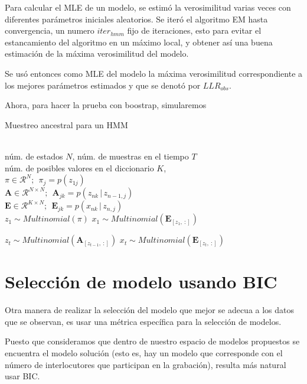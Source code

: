Para calcular el \ac{MLE} de un modelo, se estimó la verosimilitud varias veces con diferentes parámetros iniciales aleatorios. Se iteró el algoritmo \ac{EM} hasta convergencia, un numero $iter_{hmm}$ fijo de iteraciones, esto para evitar el estancamiento del algoritmo en un máximo local, y obtener así una buena estimación de la máxima verosimilitud del modelo.

Se usó entonces como \ac{MLE} del modelo la máxima verosimilitud correspondiente a los mejores parámetros estimados y que se denotó por $LLR_{obs}$.

Ahora, para hacer la prueba con boostrap, simularemos 

\begin{algorithm}[tp]
   \caption{Muestreo ancestral para un HMM}
   \label{alg:ancsamp}
\begin{algorithmic}
    \\
   núm. de estados $N$, núm. de muestras en el tiempo $T$ \\
   núm. de posibles valores en el diccionario $K$, \\
   $ \pi \in \mathcal{R}^{N}; ~~ \pi_j = p(z_{1j})$ \\
   $ \mathbf{A} \in \mathcal{R}^{N \times N}; ~~
   \mathbf{A}_{jk} = p(z_{nk} \,|\, z_{n-1, j})$ \\

   $ \mathbf{E} \in \mathcal{R}^{K \times N}; ~~
   \mathbf{E}_{jk} = p(x_{nk} \,|\, z_{n, j})$\\  
   \STATE
   \STATE $z_1 \sim Multinomial(\pi)$   
   \STATE $x_1 \sim Multinomial(\mathbf{E}_{[z_1,~:]})$

    \STATE $z_t \sim Multinomial(\mathbf{A}_{[z_{t-1},~:]})$ 
    \STATE $x_t \sim Multinomial(\mathbf{E}_{[z_t,~:]})$
   \ENDFOR   
\end{algorithmic}
\end{algorithm}

\section{Selección de modelo usando BIC}

Otra manera de realizar la selección del modelo que mejor se adecua a los datos que se observan, es usar una métrica específica para la selección de modelos.


Puesto que consideramos que dentro de nuestro espacio de modelos propuestos se encuentra el modelo solución (esto es, hay un modelo que corresponde con el número de interlocutores que participan en la grabación), resulta más natural usar \ac{BIC}.


